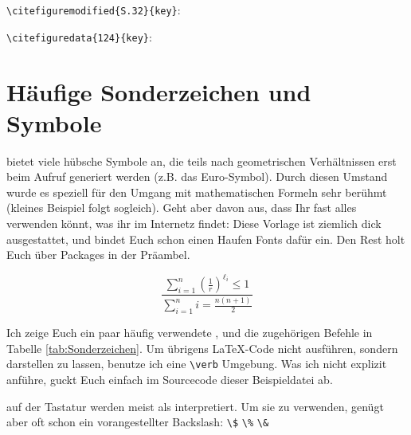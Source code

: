 \verb|\citefiguremodified{S.32}{key}|:~

\verb|\citefiguredata{124}{key}|:~











\section{Häufige Sonderzeichen und Symbole}
\label{sec:Sonderzeichen}

\latex bietet viele hübsche Symbole an, die teils nach geometrischen Verhältnissen erst beim Aufruf generiert werden (z.B. das Euro-Symbol). Durch diesen Umstand wurde es speziell für den Umgang mit mathematischen Formeln sehr berühmt (kleines Beispiel folgt sogleich). Geht aber davon aus, dass Ihr fast alles verwenden könnt, was ihr im Internetz findet: Diese Vorlage ist ziemlich dick ausgestattet, und bindet Euch schon einen Haufen Fonts dafür ein. Den Rest holt Euch über Packages in der Präambel.
	
\[ \frac{\sum_{i=1}^{n} \left( \frac{1}{r} \right)^{\ell_i} \leq 1}{\sum \limits_{i=1}^n i = \frac{n(n+1)}{2}} \]
	
Ich zeige Euch ein paar häufig verwendete , und die zugehörigen Befehle in Tabelle \ref{tab:Sonderzeichen}. Um übrigens \LaTeX-Code nicht ausführen, sondern darstellen zu lassen, benutze ich eine \verb|\verb| Umgebung.
Was ich nicht explizit anführe, guckt Euch einfach im Sourcecode dieser Beispieldatei ab.
	
 auf der Tastatur werden meist als  interpretiert. Um sie zu verwenden, genügt aber oft schon ein vorangestellter Backslash: \verb|\$| \verb|\%| \verb|\&|


